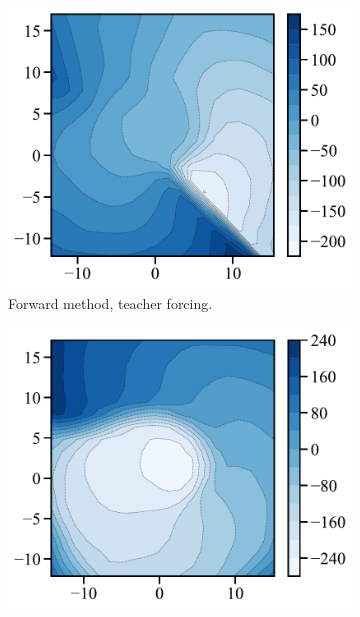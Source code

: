 \begin{figure}[t]
     \centering
     \begin{subfigure}[t]{0.24\textwidth}
         \centering
         \includegraphics[width=\textwidth]{figures/fig_energy_explicit_spiral_tf.pdf}
         \caption{Forward method, \protect\newline teacher forcing.}
     \end{subfigure}
     \hfill
     \begin{subfigure}[t]{0.24\textwidth}
         \centering
         \includegraphics[width=\textwidth]{figures/fig_energy_explicit_spiral.pdf}

\end{subfigure}
\end{figure}
